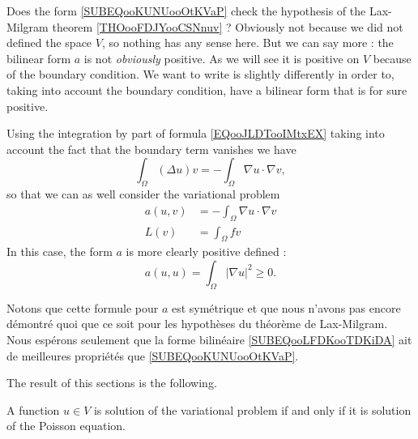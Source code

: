 Does the form \eqref{SUBEQooKUNUooOtKVaP} check the hypothesis of the Lax-Milgram theorem \ref{THOooFDJYooCSNnuv} ? Obviously not because we did not defined the space \( V\), so nothing has any sense here. But we can say more : the bilinear form \( a\) is not \emph{obviously} positive. As we will see it is positive on \( V\) because of the boundary condition. We want to write is slightly differently in order to, taking into account the boundary condition, have a bilinear form that is for sure positive.

Using the integration by part of formula \eqref{EQooJLDTooIMtxEX} taking into account the fact that the boundary term vanishes we have
\begin{equation}
    \int_{\Omega}(\Delta u)v=-\int_{\Omega}\nabla u\cdot \nabla v,
\end{equation}
so that we can as well consider the variational problem
\begin{subequations}
    \begin{align}
        a(u,v)&=-\int_{\Omega}\nabla u\cdot \nabla v   \label{SUBEQooLFDKooTDKiDA}\\
        L(v)&=\int_{\Omega}fv
    \end{align}
\end{subequations}
In this case, the form \( a\) is more clearly positive defined :
\begin{equation}
    a(u,u)=\int_{\Omega}| \nabla u |^2\geq 0.
\end{equation}

Notons que cette formule pour \( a\) est symétrique et que nous n'avons pas encore démontré quoi que ce soit pour les hypothèses du théorème de Lax-Milgram. Nous espérons seulement que la forme bilinéaire \eqref{SUBEQooLFDKooTDKiDA} ait de meilleures propriétés que \eqref{SUBEQooKUNUooOtKVaP}.

The result of this sections is the following.
\begin{proposition}
    A function \( u\in V\) is solution of the variational problem if and only if it is solution of the Poisson equation.
\end{proposition}

